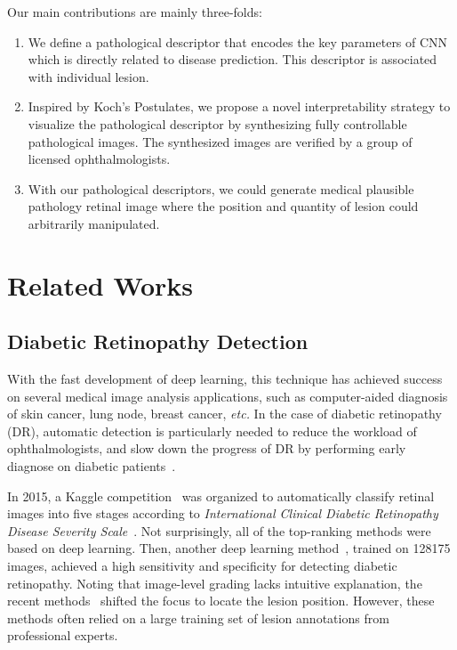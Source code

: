 \documentclass[letterpaper]{article} %
\begin{document}
	Our main contributions are mainly three-folds:
\begin{enumerate}
\item We define a pathological descriptor that encodes the key parameters of CNN which is directly related to disease prediction. This descriptor is associated with individual lesion.
\item Inspired by Koch's Postulates, we propose a novel interpretability strategy to visualize the pathological descriptor by synthesizing fully controllable pathological images. The synthesized images are  verified  by a group of licensed  ophthalmologists.
\item With our pathological descriptors, we could generate medical plausible pathology retinal image where the position and quantity of lesion could arbitrarily manipulated.
\end{enumerate}

































	\section{Related Works}
    \subsection{Diabetic Retinopathy  Detection}
    \label{sec:DR detector}
With the fast development of deep learning, this technique has achieved success on several medical image analysis applications, such as computer-aided diagnosis of skin cancer, lung node, breast cancer, \textit{etc.} In the case of diabetic retinopathy (DR), automatic detection is particularly needed to reduce the workload of ophthalmologists, and slow down the progress of DR by performing early diagnose on diabetic patients~\cite{Gulshan2016jama}.


     In 2015, a Kaggle competition~\cite{kaggle2016diabetic} was organized to automatically classify retinal images into five stages according to \textit{International Clinical Diabetic Retinopathy Disease Severity Scale}~\cite{aao2002drscale}. Not surprisingly, all of the top-ranking methods were based on deep learning. Then, another deep learning method~\cite{Gulshan2016jama}, trained on  128175 images, achieved a high sensitivity and specificity for detecting diabetic retinopathy. Noting that image-level grading lacks intuitive explanation, the recent methods~\cite{Yang17MICCAI,wang2017zoom} shifted the focus to locate the lesion position. However, these methods often relied on a large training set of lesion annotations from professional experts.
\end{document}
